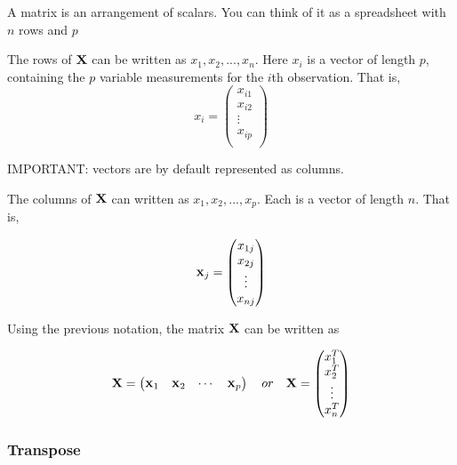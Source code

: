 \documentclass[11pt]{article}
\begin{document}
A matrix is an arrangement of scalars. You can think of it as a spreadsheet with $n$ rows and $p$\newline\newline

The rows of $\textbf X$ can be written as $x_1, x_2,...,x_n$. Here $x_i$ is a vector of length $p$, containing the $p$ variable measurements for the $i$th observation. That is,  
$$x_i = \begin{pmatrix} x_{i1}\\ x_{i2} \\ \vdots\\ x_{ip}\\ \end{pmatrix}$$\newline

IMPORTANT: vectors are by default represented as columns.\newline\newline

The columns of $\textbf X$ can written as $x_1, x_2,...,x_p$. Each is a vector of length $n$. That is,  \newline

$${\scriptsize \textbf X_j} = \begin{pmatrix} x_{1j}\\ x_{2j} \\ \vdots\\ x_{nj}\\ \end{pmatrix}$$ \newline\newline

Using the previous notation, the matrix $\textbf X$ can be written as  \newline

\begin{align*}
\textbf X = \begin{pmatrix} {\scriptsize \textbf X_1}&{\scriptsize \textbf X_2}&\cdots&{\scriptsize \textbf X_p}\\ \end{pmatrix}
\quad or \quad
\textbf X = \begin{pmatrix} x_1^T\\ x_2^T \\ \vdots\\ x_n^T\\ \end{pmatrix}
\end{align*}

\subsubsection{Transpose}
\end{document}
